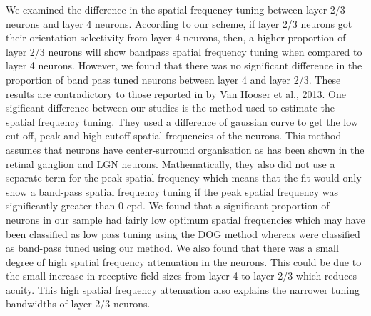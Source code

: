 We examined the difference in the spatial frequency tuning between layer 2/3 neurons and layer 4 neurons. According to our scheme, if layer 2/3 neurons got their orientation selectivity from layer 4 neurons, then, a higher proportion of layer 2/3 neurons will show bandpass spatial frequency tuning when compared to layer 4 neurons. However, we found that there was no significant difference in the proportion of band pass tuned neurons between layer 4 and layer 2/3. These results are contradictory to those reported in by Van Hooser et al., 2013. One sigificant difference between our studies is the method used to estimate the spatial frequency tuning. They used a difference of gaussian curve to get the low cut-off, peak and high-cutoff spatial frequencies of the neurons. This method assumes that neurons have center-surround organisation as has been shown in the retinal ganglion and LGN neurons. Mathematically, they also did not use a separate term for the peak spatial frequency which means that the fit would only show a band-pass spatial frequency tuning if the peak spatial frequency was significantly greater than 0 cpd. We found that a significant proportion of neurons in our sample had fairly low optimum spatial frequencies which  may have been classified as low pass tuning using the DOG method whereas were classified as band-pass tuned using our method. We also found that there was a small degree of high spatial frequency attenuation in the neurons. This could be due to the small increase in receptive field sizes from layer 4 to layer 2/3 which reduces acuity. This high spatial frequency attenuation also explains the narrower tuning bandwidths of layer 2/3 neurons.

